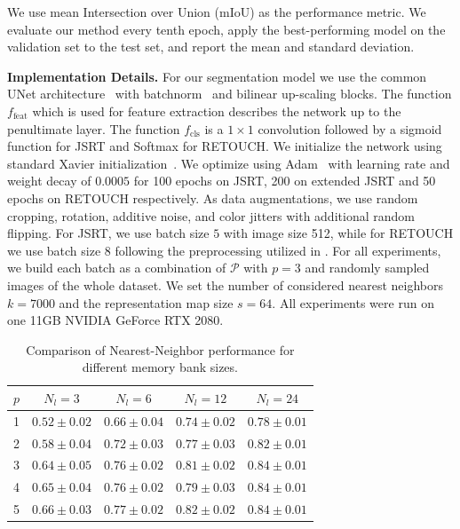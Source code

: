 \documentclass[letterpaper]{article} %
\begin{document}
 We use mean Intersection over Union (mIoU) as the performance metric. We evaluate our method every tenth epoch, apply the best-performing model on the validation set to the test set, and report the mean and standard deviation. 
 
 
\noindent\textbf{Implementation Details.}
For our segmentation model we use the common UNet architecture~\cite{ronneberger2015u} with batchnorm~\cite{ioffe2015batch} and bilinear up-scaling blocks. The function $f_{\text{feat}}$ which is used for feature extraction describes the network up to the penultimate layer. The function $f_{\text{cls}}$ is a $1\times1$ convolution followed by a sigmoid function for JSRT and Softmax for RETOUCH. We initialize the network using standard Xavier initialization~\cite{glorot2010understanding}. We optimize using Adam~\cite{kingma2014adam} with learning rate and weight decay of $0.0005$ for 100 epochs on JSRT, 200 on extended JSRT and 50 epochs on RETOUCH respectively. As data augmentations, we use random cropping, rotation, additive noise, and color jitters with additional random flipping. For JSRT, we use batch size $5$ with image size 512, while for RETOUCH we use batch size $8$ following the preprocessing utilized in \cite{reiss2021every}. For all experiments, we build each batch as a combination of $\mathcal{P}$ with $p=3$ and randomly sampled images of the whole dataset. We set the number of considered nearest neighbors $k=7000$ and the representation map size $s=64$. All experiments were run on one 11GB NVIDIA GeForce RTX 2080.


\begin{table}[tp]
  
  \centering
  \footnotesize
  \begin{tabular}{ccccc}
    \toprule
      $p$ &$N_l=3$ & $N_l=6$ & $N_l=12$ & $N_l=24$ \\ \midrule
     1 & $0.52\pm0.02$ & $0.66\pm0.04$ & $0.74\pm0.02$ & $0.78\pm0.01$ \\
     2 & $0.58\pm0.04$ & $0.72\pm0.03$ & $0.77\pm0.03$ & $0.82\pm0.01$ \\
     3 & $0.64\pm0.05$ & $0.76\pm0.02$ & $0.81\pm0.02$ & $0.84\pm0.01$ \\
     4 & $0.65\pm0.04$ & $0.76\pm0.02$ & $0.79\pm0.03$ & $0.84\pm0.01$ \\
     5 & $0.66\pm0.03$ & $0.77\pm0.02$ & $0.82\pm0.02$ & $0.84\pm0.01$ \\
     \bottomrule
  \end{tabular}
  \caption{Comparison of Nearest-Neighbor performance for different memory bank sizes.}
  \label{table:abl_nn}
\end{table}
\end{document}
